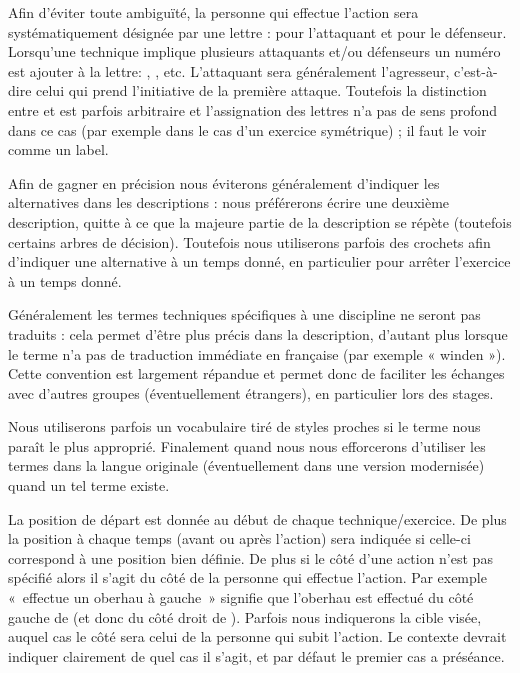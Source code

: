 Afin d'éviter toute ambiguïté, la personne qui effectue l'action sera systématiquement désignée par une lettre : \A pour l'attaquant et \D pour le défenseur.
Lorsqu'une technique implique plusieurs attaquants et/ou défenseurs un numéro est ajouter à la lettre: , , etc.
L'attaquant sera généralement l'agresseur, c'est-à-dire celui qui prend l'initiative de la première attaque.
Toutefois la distinction entre \A et \D est parfois arbitraire et l'assignation des lettres n'a pas de sens profond dans ce cas (par exemple dans le cas d'un exercice symétrique) ; il faut le voir comme un label.

Afin de gagner en précision nous éviterons généralement d'indiquer les alternatives dans les descriptions : nous préférerons écrire une deuxième description, quitte à ce que la majeure partie de la description se répète (toutefois certains arbres de décision).
Toutefois nous utiliserons parfois des crochets afin d'indiquer une alternative à un temps donné, en particulier pour arrêter l'exercice à un temps donné.

Généralement les termes techniques spécifiques à une discipline ne seront pas traduits : cela permet d'être plus précis dans la description, d'autant plus lorsque le terme n'a pas de traduction immédiate en française (par exemple « winden »).
Cette convention est largement répandue et permet donc de faciliter les échanges avec d'autres groupes (éventuellement étrangers), en particulier lors des stages.

Nous utiliserons parfois un vocabulaire tiré de styles proches si le terme nous paraît le plus approprié.
Finalement quand nous nous efforcerons d'utiliser les termes dans la langue originale (éventuellement dans une version modernisée) quand un tel terme existe.

La position de départ est donnée au début de chaque technique/exercice.
De plus la position à chaque temps (avant ou après l'action) sera indiquée si celle-ci correspond à une position bien définie.
De plus si le côté d'une action n'est pas spécifié alors il s'agit du côté de la personne qui effectue l'action.
Par exemple « \A effectue un oberhau à gauche » signifie que l'oberhau est effectué du côté gauche de \A (et donc du côté droit de \D).
Parfois nous indiquerons la cible visée, auquel cas le côté sera celui de la personne qui subit l'action.
Le contexte devrait indiquer clairement de quel cas il s'agit, et par défaut le premier cas a préséance.

% 
